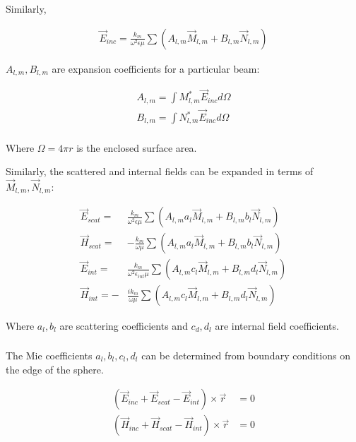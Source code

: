             Similarly,

            \begin{align}
                \vec{E}_{inc} = \frac{k_m}{\omega^2\epsilon\mu}\sum\left(A_{l,m}\vec{M}_{l,m} + B_{l,m}\vec{N}_{l,m}\right)
            \end{align}

            $A_{l,m}, B_{l,m}$ are expansion coefficients for a particular beam:

            \begin{align}
                A_{l,m} = \int M^*_{l,m}\vec{E}_{inc}d\Omega \\
                B_{l,m} = \int N^*_{l,m}\vec{E}_{inc}d\Omega \\
            \end{align}

            Where $\Omega = 4\pi r$ is the enclosed surface area.

            Similarly, the scattered and internal fields can be expanded in terms of $\vec{M}_{l,m}, \vec{N}_{l,m}$:

            \begin{align}
                \vec{E}_{scat}=& \frac{k_m}{\omega^2\epsilon\mu}\sum\left(A_{l,m}a_l\vec{M}_{l,m} + B_{l,m}b_l\vec{N}_{l,m}\right)\\
                \vec{H}_{scat}=&-\frac{k_m}{\omega\mu}\sum\left(A_{l,m}a_l\vec{M}_{l,m} + B_{l,m}b_l\vec{N}_{l,m}\right)\\
                \vec{E}_{int}=&\frac{k_m}{\omega^2\epsilon_{int}\mu}\sum\left(A_{l,m}c_l\vec{M}_{l,m} + B_{l,m}d_l\vec{N}_{l,m}\right)\\
                \vec{H}_{int}=-&\frac{ik_m}{\omega\mu}\sum\left(A_{l,m}c_l\vec{M}_{l,m} + B_{l,m}d_l\vec{N}_{l,m}\right)
            \end{align}

            Where $a_l, b_l$ are scattering coefficients and $c_d, d_l$ are internal field coefficients.

        \subsubsection{}

            The Mie coefficients $a_l, b_l, c_l, d_l$ can be determined from boundary conditions on the edge of the sphere.

            \begin{align}
                \left( \vec{E}_{inc} + \vec{E}_{scat} - \vec{E}_{int} \right) \times \vec{r} &= 0 \\
                \left( \vec{H}_{inc} + \vec{H}_{scat} - \vec{H}_{int} \right) \times \vec{r} &= 0
            \end{align}

